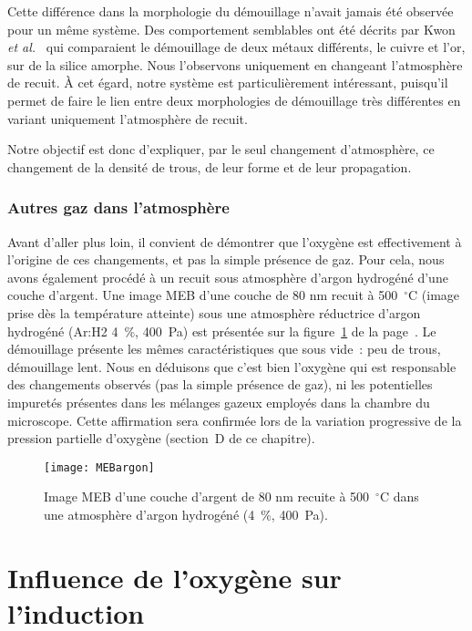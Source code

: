Cette différence dans la morphologie du démouillage n’avait jamais été observée pour un même système. Des comportement semblables ont été décrits par Kwon \textit{et al.}~\cite{kwon2003comparison} qui comparaient le démouillage de deux métaux différents, le cuivre et l’or, sur de la silice amorphe. Nous l’observons uniquement en changeant l’atmosphère de recuit. À cet égard, notre système est particulièrement intéressant, puisqu’il permet de faire le lien entre deux morphologies de démouillage très différentes en variant uniquement l’atmosphère de recuit.\par 
Notre objectif est donc d’expliquer, par le seul changement d’atmosphère, ce changement de la densité de trous, de leur forme et de leur propagation.\par 

		\subsubsection{Autres gaz dans l’atmosphère}
Avant d’aller plus loin, il convient de démontrer que l’oxygène est effectivement à l’origine de ces changements, et pas la simple présence de gaz. Pour cela, nous avons également procédé à un recuit sous atmosphère d’argon hydrogéné d’une couche d’argent. Une image MEB d’une couche de 80 nm recuit à 500~$^\circ$C (image prise dès la température atteinte) sous une atmosphère réductrice d’argon hydrogéné (Ar:H2 4~\%, 400~Pa) est présentée sur la figure~\ref{MEBargon} de la page~\pageref{MEBargon}. Le démouillage présente les mêmes caractéristiques que sous vide~: peu de trous, démouillage lent. Nous en déduisons que c’est bien l’oxygène qui est responsable des changements observés (pas la simple présence de gaz), ni les potentielles impuretés présentes dans les mélanges gazeux employés dans la chambre du microscope. Cette affirmation sera confirmée lors de la variation progressive de la pression partielle d'oxygène (section~D de ce chapitre).\par 
\begin{figure}[!p]
\centering
\texttt{[image: MEBargon]}
\caption{Image MEB d’une couche d’argent de 80 nm recuite à 500~$^\circ$C dans une atmosphère d’argon hydrogéné (4~\%, 400~Pa).}
\label{MEBargon}
\end{figure}

\section{Influence de l'oxygène sur l'induction}

